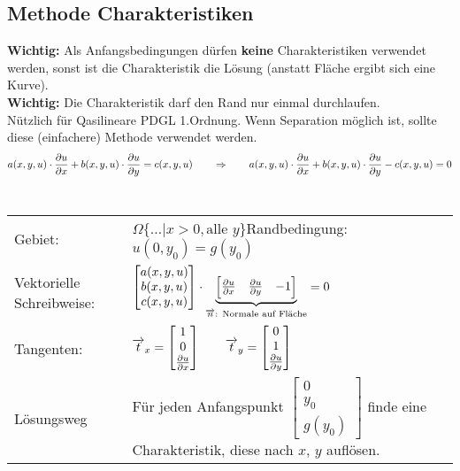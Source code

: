 \subsection{Methode Charakteristiken}
\textbf{Wichtig:} Als Anfangsbedingungen dürfen \textbf{keine} Charakteristiken verwendet werden, sonst ist die Charakteristik die Lösung (anstatt Fläche ergibt sich eine Kurve).\\
\textbf{Wichtig:} Die Charakteristik darf den Rand nur einmal durchlaufen.\\
Nützlich für Qasilineare PDGL 1.Ordnung. Wenn Separation möglich ist, sollte diese (einfachere) Methode verwendet werden.
\\

$$a(x,y,u)\cdot\frac{\partial u}{\partial x}+b(x,y,u)\cdot\frac{\partial u}{\partial y}=c(x,y,u) \qquad\Rightarrow\qquad a(x,y,u)\cdot\frac{\partial u}{\partial x}+b(x,y,u)\cdot\frac{\partial u}{\partial y}-c(x,y,u)=0$$\\


\begin{tabular}{ll}
Gebiet:& $\Omega\{\ldots|x>0, \text{alle }y\}$\qquad Randbedingung: $u(0,y_0)=g(y_0)$\\
Vektorielle Schreibweise:& $\begin{bmatrix}
	a(x,y,u)\\ b(x,y,u)\\ c(x,y,u)
\end{bmatrix}\cdot 
\underset{\overrightarrow{n}\text{: Normale auf Fläche}}{\underbrace{\begin{bmatrix}
\frac{\partial u}{\partial x} & \frac{\partial u}{\partial y} & -1
\end{bmatrix}}}=0$\\[1cm]
Tangenten:& $\overrightarrow{t}_x=\begin{bmatrix}1\\0\\ \frac{\partial u}{\partial x}\end{bmatrix}\qquad 
			\overrightarrow{t}_y=\begin{bmatrix}0\\1\\ \frac{\partial u}{\partial y}\end{bmatrix}$\\[1cm]
Lösungsweg& Für jeden Anfangspunkt $\begin{bmatrix} 0\\y_0\\g(y_0)\end{bmatrix}$ finde eine Charakteristik, diese nach $x$, $y$ auflösen.
\end{tabular}

